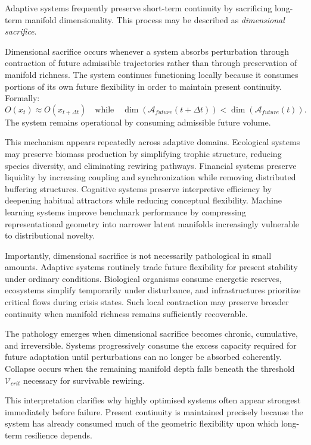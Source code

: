 \documentclass[11pt,a4paper]{article}
\newcommand{\Aspace}{\mathcal{A}}
\begin{document}
Adaptive systems frequently preserve short-term continuity by sacrificing long-term manifold dimensionality. This process may be described as \emph{dimensional sacrifice}.

Dimensional sacrifice occurs whenever a system absorbs perturbation through contraction of future admissible trajectories rather than through preservation of manifold richness. The system continues functioning locally because it consumes portions of its own future flexibility in order to maintain present continuity. Formally:
\[
O(x_t) \approx O(x_{t+\Delta t})
\quad \text{while} \quad
\dim\!\left(\Aspace_{future}(t+\Delta t)\right)
<
\dim\!\left(\Aspace_{future}(t)\right).
\]
The system remains operational by consuming admissible future volume.

This mechanism appears repeatedly across adaptive domains. Ecological systems may preserve biomass production by simplifying trophic structure, reducing species diversity, and eliminating rewiring pathways. Financial systems preserve liquidity by increasing coupling and synchronization while removing distributed buffering structures. Cognitive systems preserve interpretive efficiency by deepening habitual attractors while reducing conceptual flexibility. Machine learning systems improve benchmark performance by compressing representational geometry into narrower latent manifolds increasingly vulnerable to distributional novelty.

Importantly, dimensional sacrifice is not necessarily pathological in small amounts. Adaptive systems routinely trade future flexibility for present stability under ordinary conditions. Biological organisms consume energetic reserves, ecosystems simplify temporarily under disturbance, and infrastructures prioritize critical flows during crisis states. Such local contraction may preserve broader continuity when manifold richness remains sufficiently recoverable.

The pathology emerges when dimensional sacrifice becomes chronic, cumulative, and irreversible. Systems progressively consume the excess capacity required for future adaptation until perturbations can no longer be absorbed coherently. Collapse occurs when the remaining manifold depth falls beneath the threshold $\mathcal{V}_{crit}$ necessary for survivable rewiring.

This interpretation clarifies why highly optimised systems often appear strongest immediately before failure. Present continuity is maintained precisely because the system has already consumed much of the geometric flexibility upon which long-term resilience depends.
\end{document}
